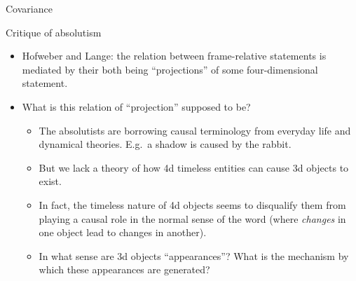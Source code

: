 \documentclass[fleqn]{beamer}
\begin{document}
\begin{frame}{Covariance}

\begin{center}
\end{center}

\end{frame}


\begin{frame}{Critique of absolutism}

  \begin{itemize}
  \item Hofweber and Lange: the relation between frame-relative
    statements is mediated by their both being ``projections'' of some
    four-dimensional statement.
  \item What is this relation of ``projection'' supposed to be?
    \begin{itemize}
    \item The absolutists are borrowing causal terminology from
      everyday life and dynamical theories. E.g.\ a shadow is caused
      by the rabbit.
    \item But we lack a theory of how 4d timeless entities can cause
      3d objects to exist.
    \item In fact, the timeless nature of 4d objects seems to
      disqualify them from playing a causal role in the normal sense
      of the word (where \textit{changes} in one object lead to
      changes in another).
    \item In what sense are 3d objects ``appearances''?  What is the
      mechanism by which these appearances are generated?
    \end{itemize}
  \end{itemize}


\end{frame}
\end{document}
